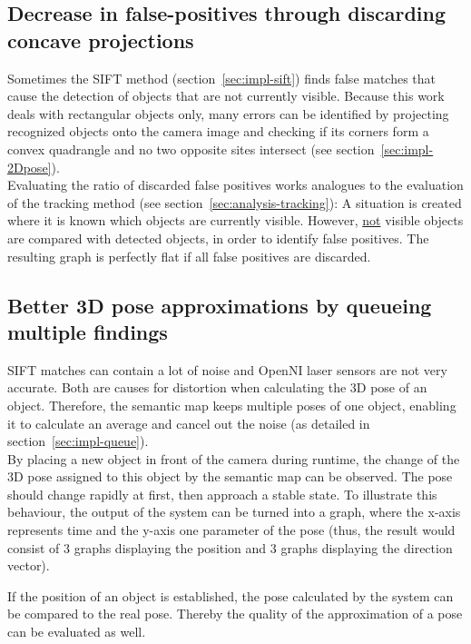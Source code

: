 \subsection{Decrease in false-positives through discarding concave projections}
Sometimes the SIFT method (section~\ref{sec:impl-sift}) finds false matches that cause the detection of objects that are not currently visible. Because this work deals with rectangular objects only, many errors can be identified by projecting recognized objects onto the camera image and checking if its corners form a convex quadrangle and no two opposite sites intersect (see section~\ref{sec:impl-2Dpose}). \\

Evaluating the ratio of discarded false positives works analogues to the evaluation of the tracking method (see section~\ref{sec:analysis-tracking}): A situation is created where it is known which objects are currently visible. However, \underline{not} visible objects are compared with detected objects, in order to identify false positives. The resulting graph is perfectly flat if all false positives are discarded.


\subsection{Better 3D pose approximations by queueing multiple findings}
SIFT matches can contain a lot of noise and OpenNI laser sensors are not very accurate. Both are causes for distortion when calculating the 3D pose of an object. Therefore, the semantic map keeps multiple poses of one object, enabling it to calculate an average and cancel out the noise (as detailed in section~\ref{sec:impl-queue}). \\

By placing a new object in front of the camera during runtime, the change of the 3D pose assigned to this object by the semantic map can be observed. The pose should change rapidly at first, then approach a stable state. To illustrate this behaviour, the output of the system can be turned into a graph, where the x-axis represents time and the y-axis one parameter of the pose (thus, the result would consist of 3 graphs displaying the position and 3 graphs displaying the direction vector).

If the position of an object is established, the pose calculated by the system can be compared to the real pose. Thereby the quality of the approximation of a pose can be evaluated as well. \\

